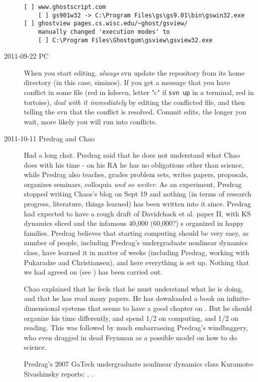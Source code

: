 \begin{description}
\begin{verbatim}
[ ] www.ghostscript.com
    [ ] gs901w32 -> C:\Program Files\gs\gs9.01\bin\gswin32.exe
[ ] ghostview pages.cs.wisc.edu/~ghost/gsview/
    manually changed 'execution modes' to
    [ ] C:\Program Files\Ghostgum\gsview\gsview32.exe
\end{verbatim}

\item[2011-09-22 PC] When you start editing, \emph{always} svn update
the repository from its home directory (in this case, siminos). If you
get a message that you have conflict in some file (red in kdesvn, letter "c"
if \texttt{svn up} in a terminal, red in tortoise), \emph{deal with it immediately}
by editing the conflicted file, and then telling the svn that the conflict is resolved.
Commit edits, the longer you wait, more likely you will run into conflicts.

\item[2011-10-11 Predrag and Chao]
Had a long chat. Predrag said that he does not understand what Chao does
with his time - on his RA he has no obligations other than science, while
Predrag also teaches, grades problem sets, writes papers, proposals,
organizes seminars, colloquia \emph{und so weiter}. As an experiment,
Predrag stopped writing Chaos's blog on Sept 19 and nothing (in terms of
research progress, literature, things learned) has been written into it
since. Predrag had expected to have a rough draft of Davidchack et al.
paper II, with KS dynamics sliced and the infamous 40,000 (60,000?) \rpo
s organized in happy families. Predrag believes that starting computing
should be very easy, as number of people, including Predrag's
undergraduate nonlinear dynamics class, have learned it in matter of
weeks (including Predrag, working with Pukaradze and Christiansen), and
here everything is set up. Nothing that we had agreed on (see
) has been carried out.

Chao explained that he feels that he must understand what he is doing,
and that he has read many papers. He has downloaded a book on
infinite-dimensional systems that seems to have a good chapter on \KS.
But he should organize his time differently, and spend 1/2 on computing,
and 1/2 on reading. This was followed by much embarrassing Predrag's
windbaggery, who even dragged in dead Feynman as a possible model on how
to do science.

Predrag's 2007 GaTech undergraduate nonlinear dynamics class
Kuramoto-Sivashinsky reports:
,
.



\end{description}

